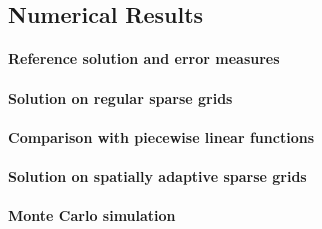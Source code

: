 \subsection{Numerical Results}

\paragraph{Reference solution and error measures}

\dummytext[3]{}

\paragraph{Solution on regular sparse grids}

\dummytext[5]{}

\paragraph{Comparison with piecewise linear functions}

\dummytext[5]{}

\paragraph{Solution on spatially adaptive sparse grids}

\dummytext[5]{}

\paragraph{Monte Carlo simulation}


\dummytext[5]{}
